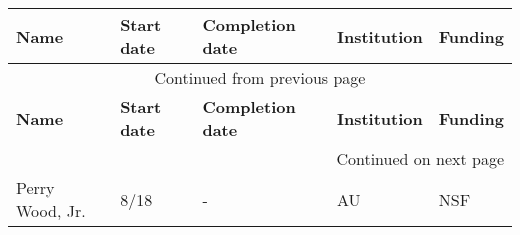 {\sffamily\small
{}
\begin{longtable}[l]{ p{1.2in} p{0.5in} p{0.8in}p{0.75in} p{2in} }
    \hline
    \textbf{Name} & \textbf{Start date} & \textbf{Completion date} & \textbf{Institution} & \textbf{Funding} \\
    \hline
    \endfirsthead
    \multicolumn{5}{c}{{Continued from previous page}} \\
    \hline
    \textbf{Name} & \textbf{Start date} & \textbf{Completion date} & \textbf{Institution} & \textbf{Funding} \\
    \hline
    \endhead
    \hline \multicolumn{5}{r}{{Continued on next page}} \\
    \endfoot
    \hline
    \endlastfoot
    Perry Wood, Jr. & 8/18 & - & AU & NSF \\
\end{longtable}
}
